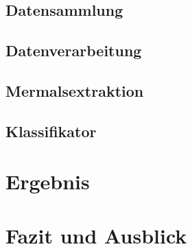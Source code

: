 \section{Datensammlung}


\section{Datenverarbeitung}


\section{Mermalsextraktion}


\section{Klassifikator}



\chapter{Ergebnis}


\chapter{Fazit und Ausblick}



\cleardoublepage 


\cleardoublepage


